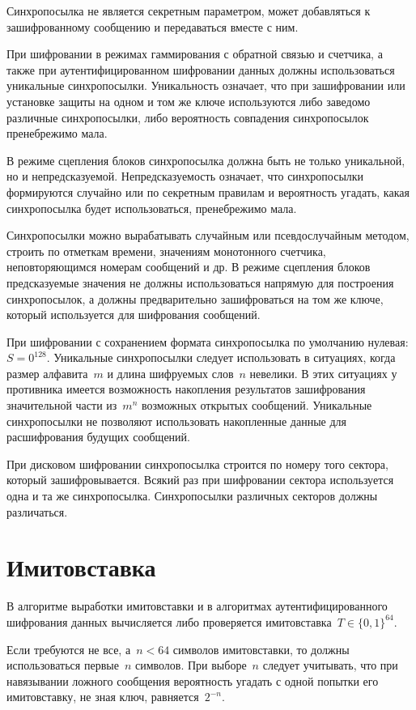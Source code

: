 Синхропосылка не является секретным параметром, 
может добавляться к зашифрованному сообщению и передаваться вместе с ним.

При шифровании в режимах гаммирования с обратной связью и счетчика, 
а также при аутентифицированном шифровании данных должны использоваться 
уникальные синхропосылки.
%
Уникальность означает, что при зашифровании или установке защиты 
на одном и том же ключе используются либо заведомо различные синхропосылки,
либо вероятность совпадения синхропосылок пренебрежимо мала.

В режиме сцепления блоков синхропосылка должна быть не только 
уникальной, но и непредсказуемой.
%
Непредсказуемость означает, что синхропосылки формируются случайно
или по секретным правилам и вероятность угадать, 
какая синхропосылка будет использоваться, пренебрежимо мала.

Синхропосылки можно вырабатывать случайным или псевдослучайным 
методом, строить по отметкам времени, значениям монотонного счетчика, 
неповторяющимся номерам сообщений и др.
%
В режиме сцепления блоков предсказуемые значения не должны
использоваться напрямую для построения синхропосылок, 
а должны предварительно зашифроваться на том же ключе, 
который используется для шифрования сообщений.

При шифровании с сохранением формата синхропосылка 
по умолчанию нулевая: $S=0^{128}$.
%
Уникальные синхропосылки следует использовать в ситуациях,
когда размер алфавита~$m$ и длина шифруемых слов~$n$ невелики.
%
В этих ситуациях у противника имеется возможность накопления 
результатов зашифрования значительной части из~$m^n$ возможных открытых 
сообщений. 
%
Уникальные синхропосылки не позволяют использовать накопленные 
данные для расшифрования будущих сообщений.

При дисковом шифровании синхропосылка строится по номеру того сектора, который
зашифровывается. Всякий раз при шифровании сектора используется одна и та же
синхропосылка. Синхропосылки различных секторов должны различаться.

\section{Имитовставка}\label{COMMON.MAC}

В алгоритме выработки имитовставки и в алгоритмах аутентифицированного шифрования
данных вычисляется либо проверяется имитовставка~$T\in\{0,1\}^{64}$.

Если требуются не все, а~$n<64$ символов имитовставки, 
то должны использоваться первые~$n$ символов.
%
При выборе~$n$ следует учитывать, что при навязывании ложного сообщения 
вероятность угадать с одной попытки его имитовставку, не зная ключ,
равняется~$2^{-n}$.

